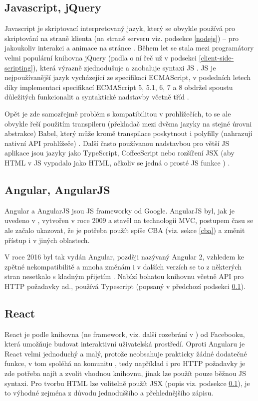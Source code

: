         \subsection{Javascript, jQuery}\label{js}
        Javascript je skriptovací interpretovaný jazyk, který se obvykle používá pro skriptování na straně klienta (na straně serveru viz. podsekce \ref{nodejs}) -- pro jakoukoliv interakci a animace na stránce \cite{js2}. Během let se stala mezi programátory velmi populární knihovna jQuery (padla o ní řeč už v podsekci \ref{client-side-scripting}), která výrazně zjednodušuje a zaobaluje syntaxi JS \cite{scripting-upwork}. JS je nejpoužívanější jazyk vycházející ze specifikací ECMAScript, v posledních letech díky implementaci specifikací ECMAScript 5, 5.1, 6, 7 a 8 obdržel spoustu důležitých funkcionalit a syntaktické nadstavby včetně tříd \cite{js3}.
        
        Opět je zde samozřejmě problém s kompatibilitou v prohlížečích, to se ale obvykle řeší použitím transpileru (překladač mezi dvěma jazyky na stejné úrovni abstrakce) Babel, který může kromě transpilace poskytnout i polyfilly (nahrazují nativní API prohlížeče) \cite{js4}\cite{js1}. Další často používanou nadstavbou pro větší JS aplikace jsou jazyky jako TypeScript, CoffeeScript \cite{js5} nebo rozšíření JSX (aby HTML v JS vypadalo jako HTML, ačkoliv se jedná o prosté JS funkce \cite{js-fw3}) \cite{js6}.
        
        \subsection{Angular, AngularJS}\label{sec:angular}
        Angular a AngularJS jsou JS frameworky od Google. AngularJS byl, jak je uvedeno v \cite{angular1}, vytvořen v roce 2009 a stavěl na technologii MVC, postupem času se ale začalo ukazovat, že je potřeba použít spíše CBA (viz. sekce \ref{cba}) a změnit přístup i v jiných oblastech. 
        
        V roce 2016 byl tak vydán Angular, později nazývaný Angular 2, vzhledem ke zpětné nekompatibilitě a mnoha změnám i v dalších verzích \cite{js-fw2} se to z některých stran nesetkalo s kladným přijetím \cite{angular2}\cite{js-fw1}. Nabízí bohatou knihovnu včetně API pro HTTP požadavky ad., používá Typescript (popsaný v předchozí podsekci \ref{js}).
        
        \subsection{React}\label{react}
        React je podle \cite{react} knihovna (ne framework, viz. další rozebrání v \cite{js-fw1}) od Facebooku, která umožňuje budovat interaktivní uživatelská prostředí. Oproti Angularu je React velmi jednoduchý a malý, protože neobsahuje prakticky žádné dodatečné funkce, v tom spoléhá na komunitu \cite{js-fw1}, tedy například i pro HTTP požadavky je zde potřeba najít a zvolit vhodnou knihovnu, jinak lze použít pouze běžnou JS syntaxi. Pro tvorbu HTML lze volitelně použít JSX (popis viz. podsekce \ref{js}), je to výhodné zejména z důvodu jednoduššího a přehlednějšího zápisu.
        
